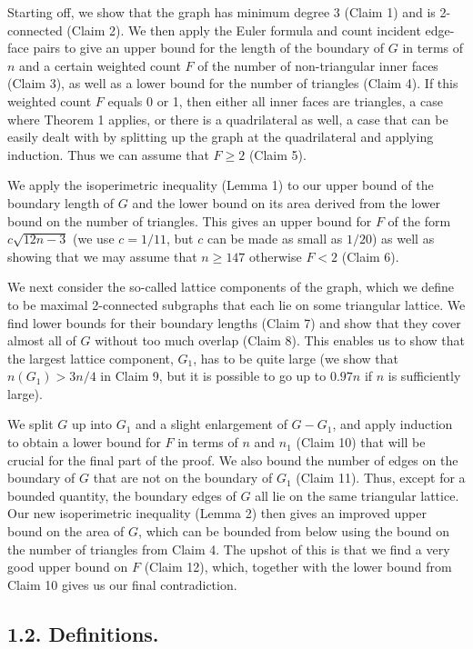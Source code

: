 \documentclass{article}
\begin{document}
Starting off, we show that the graph has minimum degree 3 (Claim 1) and is 2-connected (Claim 2). We then apply the Euler formula and count incident edge-face pairs to give an upper bound for the length of the boundary of $G$ in terms of $n$ and a certain weighted count $F$ of the number of non-triangular inner faces (Claim 3), as well as a lower bound for the number of triangles (Claim 4). If this weighted count $F$ equals 0 or 1, then either all inner faces are triangles, a case where Theorem 1 applies, or there is a quadrilateral as well, a case that can be easily dealt with by splitting up the graph at the quadrilateral and applying induction. Thus we can assume that $F \ge 2$ (Claim 5).

We apply the isoperimetric inequality (Lemma 1) to our upper bound of the boundary length of $G$ and the lower bound on its area derived from the lower bound on the number of triangles. This gives an upper bound for $F$ of the form $c\sqrt{12n - 3}$ (we use $c = 1/11$, but $c$ can be made as small as $1/20$) as well as showing that we may assume that $n \ge 147$ otherwise $F < 2$ (Claim 6).

We next consider the so-called lattice components of the graph, which we define to be maximal 2-connected subgraphs that each lie on some triangular lattice. We find lower bounds for their boundary lengths (Claim 7) and show that they cover almost all of $G$ without too much overlap (Claim 8). This enables us to show that the largest lattice component, $G_{1}$, has to be quite large (we show that $n(G_{1}) > 3n/4$ in Claim 9, but it is possible to go up to $0.97n$ if $n$ is sufficiently large).

We split $G$ up into $G_{1}$ and a slight enlargement of $G - G_{1}$, and apply induction to obtain a lower bound for $F$ in terms of $n$ and $n_{1}$ (Claim 10) that will be crucial for the final part of the proof. We also bound the number of edges on the boundary of $G$ that are not on the boundary of $G_{1}$ (Claim 11). Thus, except for a bounded quantity, the boundary edges of $G$ all lie on the same triangular lattice. Our new isoperimetric inequality (Lemma 2) then gives an improved upper bound on the area of $G$, which can be bounded from below using the bound on the number of triangles from Claim 4. The upshot of this is that we find a very good upper bound on $F$ (Claim 12), which, together with the lower bound from Claim 10 gives us our final contradiction.

\subsection*{1.2. Definitions.}
\end{document}
